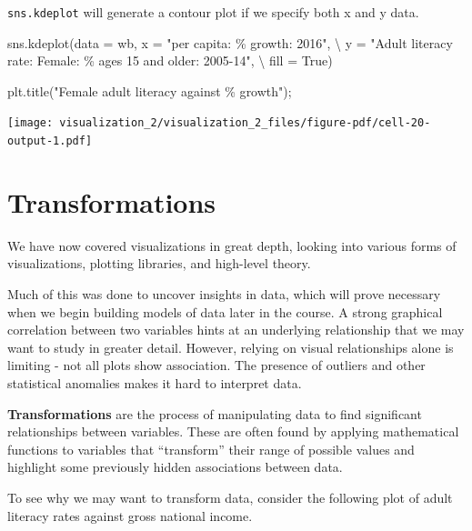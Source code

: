 \documentclass[
  letterpaper,
  DIV=11,
  numbers=noendperiod]{scrreprt}
\newenvironment{Shaded}{\begin{snugshade}}{\end{snugshade}}
\newcommand{\NormalTok}[1]{\textcolor[rgb]{0.00,0.23,0.31}{#1}}
\newcommand{\OperatorTok}[1]{\textcolor[rgb]{0.37,0.37,0.37}{#1}}
\newcommand{\SpecialCharTok}[1]{\textcolor[rgb]{0.37,0.37,0.37}{#1}}
\newcommand{\StringTok}[1]{\textcolor[rgb]{0.13,0.47,0.30}{#1}}
\newcommand{\VariableTok}[1]{\textcolor[rgb]{0.07,0.07,0.07}{#1}}
\begin{document}
\texttt{sns.kdeplot} will generate a contour plot if we specify both x
and y data.

\begin{Shaded}
\begin{Highlighting}[]
\NormalTok{sns.kdeplot(data }\OperatorTok{=}\NormalTok{ wb, x }\OperatorTok{=} \StringTok{"per capita: }\SpecialCharTok{\% g}\StringTok{rowth: 2016"}\NormalTok{, }\OperatorTok{\textbackslash{}}
\NormalTok{            y }\OperatorTok{=} \StringTok{"Adult literacy rate: Female: \% ages 15 and older: 2005{-}14"}\NormalTok{, }\OperatorTok{\textbackslash{}}
\NormalTok{            fill }\OperatorTok{=} \VariableTok{True}\NormalTok{)}

\NormalTok{plt.title(}\StringTok{"Female adult literacy against }\SpecialCharTok{\% g}\StringTok{rowth"}\NormalTok{)}\OperatorTok{;}
\end{Highlighting}
\end{Shaded}

\texttt{[image: visualization\_2/visualization\_2\_files/figure-pdf/cell-20-output-1.pdf]}

\section{Transformations}\label{transformations}

We have now covered visualizations in great depth, looking into various
forms of visualizations, plotting libraries, and high-level theory.

Much of this was done to uncover insights in data, which will prove
necessary when we begin building models of data later in the course. A
strong graphical correlation between two variables hints at an
underlying relationship that we may want to study in greater detail.
However, relying on visual relationships alone is limiting - not all
plots show association. The presence of outliers and other statistical
anomalies makes it hard to interpret data.

\textbf{Transformations} are the process of manipulating data to find
significant relationships between variables. These are often found by
applying mathematical functions to variables that ``transform'' their
range of possible values and highlight some previously hidden
associations between data.

To see why we may want to transform data, consider the following plot of
adult literacy rates against gross national income.
\end{document}
